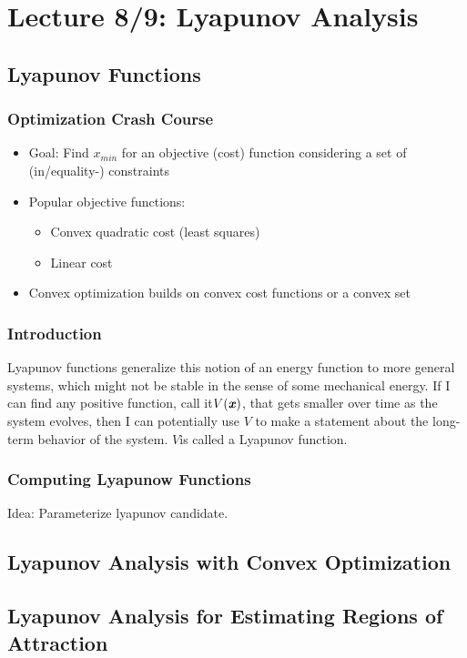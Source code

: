 \chapter{Lecture 8/9: Lyapunov Analysis}
\section{Lyapunov Functions}
\subsection{Optimization Crash Course}
\begin{itemize}
\item Goal: Find $x_{min}$ for an objective (cost) function considering a set of (in/equality-) constraints
\item Popular objective functions:
\begin{itemize}
\item Convex quadratic cost (least squares)
\item Linear cost
\end{itemize}
\item Convex optimization builds on convex cost functions or a convex set
\end{itemize}

\subsection{Introduction}
Lyapunov functions generalize this notion of an energy function to more general systems, which might not be stable in the sense of some mechanical energy. If I can find any positive function, call it$V(\bm{\mathit{x}})$, that gets smaller over time as the system evolves, then I can potentially use $V$ to make a statement about the long-term behavior of the system. $V$is called a Lyapunov function. 

\subsection{Computing Lyapunow Functions}
Idea: Parameterize lyapunov candidate.


\section{Lyapunov Analysis with Convex Optimization}
\section{Lyapunov Analysis for Estimating Regions of Attraction}

